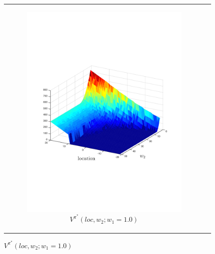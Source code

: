 {\centering
    \begin{figure}[ht]
        \begin{tabular}{cc}
            \begin{subfigure}{0.24\textwidth}\centering\includegraphics[width=\textwidth]{images/robot_vf_new}\caption{{\footnotesize $V^{\pi^{*}}(loc, w_2; w_1 = 1.0)$} }\label{fig:navigation_vf}\end{subfigure}&

\end{tabular}
\end{figure}}

